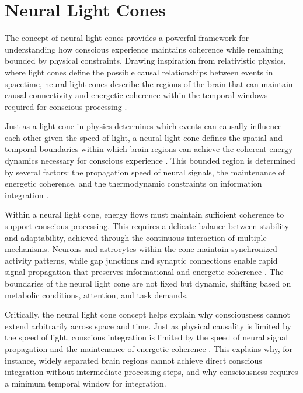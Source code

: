 \section{Neural Light Cones}

The concept of neural light cones provides a powerful framework for understanding how conscious experience maintains coherence while remaining bounded by physical constraints. Drawing inspiration from relativistic physics, where light cones define the possible causal relationships between events in spacetime, neural light cones describe the regions of the brain that can maintain causal connectivity and energetic coherence within the temporal windows required for conscious processing \cite{herzog2016time}.

Just as a light cone in physics determines which events can causally influence each other given the speed of light, a neural light cone defines the spatial and temporal boundaries within which brain regions can achieve the coherent energy dynamics necessary for conscious experience \cite{northoff2017how}. This bounded region is determined by several factors: the propagation speed of neural signals, the maintenance of energetic coherence, and the thermodynamic constraints on information integration \cite{bekenstein1981universal}.

Within a neural light cone, energy flows must maintain sufficient coherence to support conscious processing. This requires a delicate balance between stability and adaptability, achieved through the continuous interaction of multiple mechanisms. Neurons and astrocytes within the cone maintain synchronized activity patterns, while gap junctions and synaptic connections enable rapid signal propagation that preserves informational and energetic coherence \cite{melloni2007synchronization}. The boundaries of the neural light cone are not fixed but dynamic, shifting based on metabolic conditions, attention, and task demands.

Critically, the neural light cone concept helps explain why consciousness cannot extend arbitrarily across space and time. Just as physical causality is limited by the speed of light, conscious integration is limited by the speed of neural signal propagation and the maintenance of energetic coherence \cite{delcul2007brain}. This explains why, for instance, widely separated brain regions cannot achieve direct conscious integration without intermediate processing steps, and why consciousness requires a minimum temporal window for integration.

